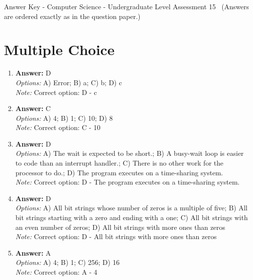 \documentclass[12pt]{article}
\begin{document}
\begin{center}
Answer Key - Computer Science - Undergraduate Level Assessment 15 \
\small (Answers are ordered exactly as in the question paper.)
\end{center}

\section*{Multiple Choice}
\begin{enumerate}[label=\arabic*.]
\item \textbf{Answer:} D
\\ \textit{Options:} A) Error; B) a; C) b; D) c
\\ \textit{Note:} Correct option: D - c
\item \textbf{Answer:} C
\\ \textit{Options:} A) 4; B) 1; C) 10; D) 8
\\ \textit{Note:} Correct option: C - 10
\item \textbf{Answer:} D
\\ \textit{Options:} A) The wait is expected to be short.; B) A busy-wait loop is easier to code than an interrupt handler.; C) There is no other work for the processor to do.; D) The program executes on a time-sharing system.
\\ \textit{Note:} Correct option: D - The program executes on a time-sharing system.
\item \textbf{Answer:} D
\\ \textit{Options:} A) All bit strings whose number of zeros is a multiple of five; B) All bit strings starting with a zero and ending with a one; C) All bit strings with an even number of zeros; D) All bit strings with more ones than zeros
\\ \textit{Note:} Correct option: D - All bit strings with more ones than zeros
\item \textbf{Answer:} A
\\ \textit{Options:} A) 4; B) 1; C) 256; D) 16
\\ \textit{Note:} Correct option: A - 4
\end{enumerate}
\end{document}
